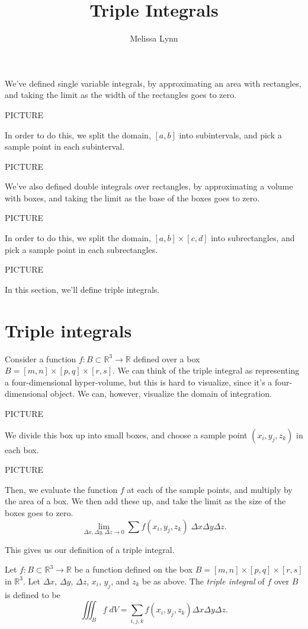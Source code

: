 \documentclass{ximera}
\title{Triple Integrals}
\author{Melissa Lynn}
\begin{document}
  
\begin{abstract}  
\end{abstract}  
\maketitle  

We've defined single variable integrals, by approximating an area with rectangles, and taking the limit as the width of the rectangles goes to zero.

PICTURE

In order to do this, we split the domain, $[a,b]$ into subintervals, and pick a sample point in each subinterval.

PICTURE

We've also defined double integrals over rectangles, by approximating a volume with boxes, and taking the limit as the base of the boxes goes to zero.

PICTURE

In order to do this, we split the domain, $[a,b]\times[c,d]$ into subrectangles, and pick a sample point in each subrectangles.

PICTURE

In this section, we'll define triple integrals.


\section*{Triple integrals}

Consider a function $f:B\subset \mathbb{R}^3\rightarrow\mathbb{R}$ defined over a box $B = [m,n]\times[p,q]\times[r,s]$. We can think of the triple integral as representing a four-dimensional hyper-volume, but this is hard to visualize, since it's a four-dimensional object. We can, however, visualize the domain of integration.

PICTURE

We divide this box up into small boxes, and choose a sample point $(x_i, y_j, z_k)$ in each box.

PICTURE

Then, we evaluate the function $f$ at each of the sample points, and multiply by the area of a box. We then add these up, and take the limit as the size of the boxes goes to zero.
\[
\lim_{\Delta x, \Delta y, \Delta z\rightarrow 0}\sum f(x_i,y_j,z_k)\;\Delta x\Delta y\Delta z.
\]

This gives us our definition of a triple integral.

\begin{definition}
Let $f:B\subset \mathbb{R}^3\rightarrow\mathbb{R}$ be a function defined on the box $B=[m,n]\times[p,q]\times[r,s]$ in $\mathbb{R}^3$. Let $\Delta x$, $\Delta y$, $\Delta z$, $x_i$, $y_j$, and $z_k$ be as above. The \emph{triple integral} of $f$ over $B$ is defined to be
\[
\iiint_B f\;dV = \sum_{i,j,k} f(x_i,y_j,z_k)\Delta x\Delta y\Delta z .
\]
\end{definition}
\end{document}
